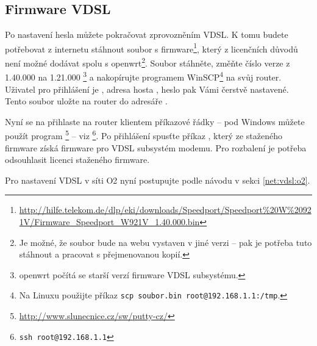 \subsection{Firmware VDSL}
Po nastavení hesla můžete pokračovat zprovozněním VDSL.
K tomu budete
potřebovat z internetu stáhnout soubor s firmware\footnote{
\url{http://hilfe.telekom.de/dlp/eki/downloads/Speedport/Speedport\%20W\%20921V/Firmware\_Speedport\_W921V\_1.40.000.bin}},
který z licenčních důvodů není možné dodávat spolu s \gls{openwrt}\footnote{
Je možné, že soubor bude na webu vystaven v jiné verzi -- pak je potřeba tuto
stáhnout a pracovat s přejmenovanou kopií.
}. Soubor stáhněte, změňte číslo verze z 1.40.000 na 1.21.000 \footnote{\gls{openwrt}
\wrtversion počítá se starší verzí firmware VDSL subsystému.}
a nakopírujte programem WinSCP\footnote{Na Linuxu použijte příkaz
{\texttt{scp soubor.bin root@192.168.1.1:/tmp}}.} na svůj router. Uživatel pro přihlášení
je , adresa hosta , heslo pak Vámi čerstvě nastavené.
Tento soubor uložte na router do adresáře .

Nyní se na přihlaste na router klientem příkazové řádky -- pod Windows můžete
použít program \footnote{\url{http://www.slunecnice.cz/sw/putty-cz/}} -- viz \footnote{\texttt{ssh root@192.168.1.1}}.
Po přihlášení spusťte příkaz , který ze staženého firmware
získá firmware pro VDSL subsystém modemu. Pro rozbalení je potřeba odsouhlasit
licenci staženého firmware.

Pro nastavení VDSL v síti O2 nyní postupujte podle návodu v sekci \ref{net:vdsl:o2}.
